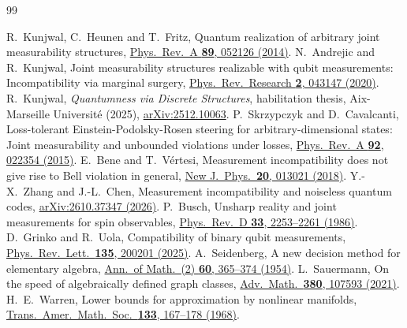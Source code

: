 \documentclass[11pt,a4paper]{article}
\theoremstyle{definition}
\begin{document}
\begin{thebibliography}{99}
\small
\setlength{\itemsep}{0pt}
\setlength{\parsep}{0pt}
\raggedright
{}
R.~Kunjwal, C.~Heunen and T.~Fritz,
Quantum realization of arbitrary joint measurability structures,
\href{https://doi.org/10.1103/PhysRevA.89.052126}{Phys.\ Rev.\ A
\textbf{89}, 052126 (2014)}.
N.~Andrejic and R.~Kunjwal,
Joint measurability structures realizable with qubit measurements:
Incompatibility via marginal surgery,
\href{https://doi.org/10.1103/PhysRevResearch.2.043147}{Phys.\ Rev.\ Research
\textbf{2}, 043147 (2020)}.
R.~Kunjwal, \emph{Quantumness via Discrete Structures},
habilitation thesis, Aix-Marseille Universit\'e (2025), \href{https://arxiv.org/abs/2512.10063}{arXiv:2512.10063}.
P.~Skrzypczyk and D.~Cavalcanti, Loss-tolerant Einstein-Podolsky-Rosen
steering for arbitrary-dimensional states: Joint measurability and unbounded
violations under losses,
\href{https://doi.org/10.1103/PhysRevA.92.022354}{Phys.\ Rev.\ A
\textbf{92}, 022354 (2015)}.
E.~Bene and T.~V\'ertesi, Measurement incompatibility does not give rise
to Bell violation in general,
\href{https://doi.org/10.1088/1367-2630/aa9ca3}{New J.\ Phys.\
\textbf{20}, 013021 (2018)}.
Y.-X.~Zhang and J.-L.~Chen, Measurement incompatibility and noiseless quantum codes,
\href{https://arxiv.org/abs/2610.37347}{arXiv:2610.37347 (2026)}.
\bibitem{Busch}
P.~Busch, Unsharp reality and joint measurements for spin observables,
\href{https://doi.org/10.1103/PhysRevD.33.2253}{Phys.\ Rev.\ D
\textbf{33}, 2253--2261 (1986)}.
D.~Grinko and R.~Uola, Compatibility of binary qubit measurements,
\href{https://doi.org/10.1103/vv1h-5mf9}{Phys.\ Rev.\ Lett.\
\textbf{135}, 200201 (2025)}.
\bibitem{Seidenberg}
A.~Seidenberg, A new decision method for elementary algebra,
\href{https://doi.org/10.2307/1969640}{Ann.\ of Math.\ (2)
\textbf{60}, 365--374 (1954)}.
\bibitem{Sauermann}
L.~Sauermann, On the speed of algebraically defined graph classes,
\href{https://doi.org/10.1016/j.aim.2021.107593}{Adv.\ Math.\
\textbf{380}, 107593 (2021)}.
\bibitem{Warren}
H.~E.~Warren, Lower bounds for approximation by nonlinear manifolds,
\href{https://doi.org/10.1090/S0002-9947-1968-0226281-1}{Trans.\ Amer.\
Math.\ Soc.\ \textbf{133}, 167--178 (1968)}.
\end{thebibliography}
\end{document}

